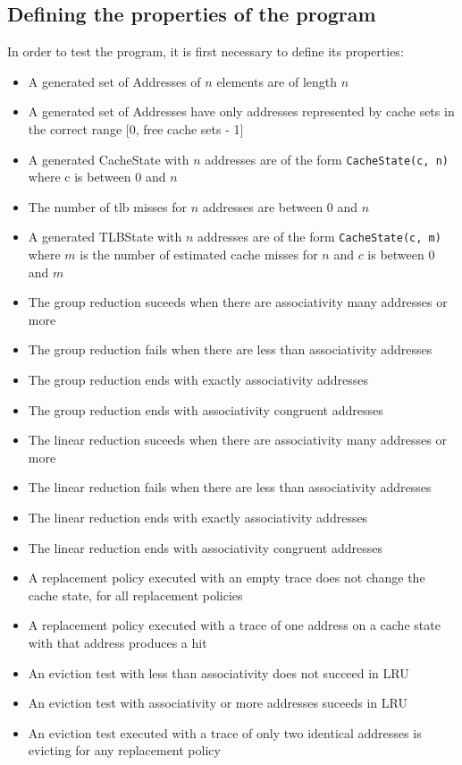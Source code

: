 \documentclass[11pt]{article}
\begin{document}
\subsection{Defining the properties of the program}
In order to test the program, it is first necessary to define its properties:
\begin{itemize}[label=--]
\item A generated set of Addresses of $n$ elements are of length $n$
\item A generated set of Addresses have only addresses represented by cache sets in the correct range [0, free cache sets - 1]
\item A generated CacheState with $n$ addresses are of the form \texttt{CacheState(c, n)} where c is between 0 and $n$
\item The number of tlb misses for $n$ addresses are between 0 and $n$
\item A generated TLBState with $n$ addresses are of the form \texttt{CacheState(c, m)} where $m$ is the number of estimated cache misses for $n$ and $c$ is between 0 and $m$
\item The group reduction suceeds when there are associativity many addresses or more
\item The group reduction fails when there are less than associativity addresses
\item The group reduction ends with exactly associativity addresses
\item The group reduction ends with associativity congruent addresses
\item The linear reduction suceeds when there are associativity many addresses or more
\item The linear reduction fails when there are less than associativity addresses
\item The linear reduction ends with exactly associativity addresses
\item The linear reduction ends with associativity congruent addresses
\item A replacement policy executed with an empty trace does not change the cache state, for all replacement policies
\item A replacement policy executed with a trace of one address on a cache state with that address produces a hit
\item An eviction test with less than associativity does not succeed in LRU
\item An eviction test with associativity or more addresses suceeds in LRU
\item An eviction test executed with a trace of only two identical addresses is evicting for any replacement policy
\end{itemize}
\end{document}
